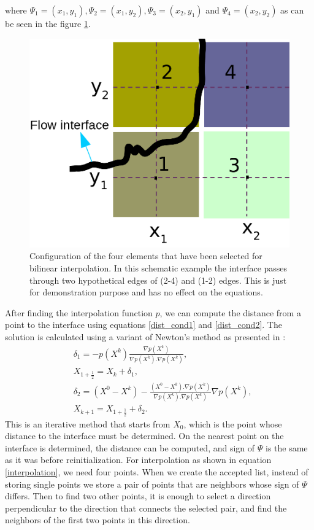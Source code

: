 \documentclass[review]{elsarticle}
\begin{document}
where $\varPsi_1=(x_1,y_1), \varPsi_2=(x_1,y_2), \varPsi_3=(x_2,y_1)$ and $\varPsi_4=(x_2,y_2)$ as can be seen in the figure \ref{fig:bilinear_interp}.
\begin{figure}[ht]
\centering
\includegraphics[scale=.15]{IMAGES/bilinear_interp.png}
\caption{Configuration of the four elements that have been selected for bilinear interpolation. In this schematic example the interface passes through two hypothetical edges of (2-4) and (1-2) edges. This is just for demonstration purpose and has no effect on the equations.}
                \label{fig:bilinear_interp}
\end{figure}
After finding the interpolation function $p$, we can compute the distance from a point to the interface using equations \eqref{dist_cond1} and \eqref{dist_cond2}. 
The solution is calculated using a variant of Newton's method as presented in \cite{Chopp2001}:
\begin{subequations}
\label{eqnewton}
\begin{align}
&\delta_1=-p(X^k)\frac{\nabla p(X^k)}{\nabla p(X^k).\nabla p(X^k)},\\
& X_{1+\frac{1}{2}}=X_k+\delta_1,\\
& \delta_2=(X^0-X^k)-\frac{(X^0-X^k).\nabla p(X^k)}{\nabla p(X^k).\nabla p(X^k)}\nabla p(X^k),\\
&X_{k+1}=X_{1+\frac{1}{2}}+\delta_2.
\end{align}
\end{subequations}
This is an iterative method that starts from $X_0$, which is the point whose distance to the interface must be determined. 
On the nearest point on the interface is determined, the distance can be computed, and sign of $\varPsi$ is the same as it was before reinitialization.
For interpolation as shown in equation \eqref{interpolation}, we need four points. When we create the accepted list, instead of storing single points we store a pair of points that are 
neighbors whose sign of $\varPsi$ differs. Then to find two other points, it is enough to select a direction perpendicular to the direction that connects the selected pair, 
and find the neighbors of the first two points in this direction. 
\end{document}
